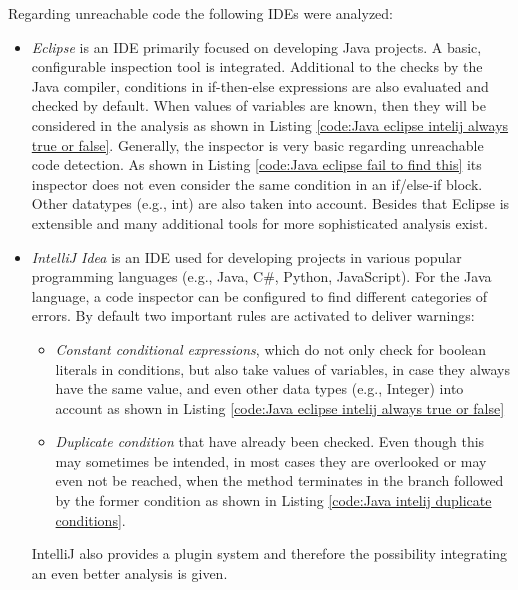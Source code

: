 Regarding unreachable code the following IDEs were analyzed:
\begin{itemize}
	\item \emph{Eclipse} \cite{incCommunityOpenInnovation} is an IDE primarily focused on developing Java projects. A basic, configurable inspection tool is integrated. Additional to the checks by the Java compiler, conditions in if-then-else expressions are also evaluated and checked by default. When values of variables are known, then they will be considered in the analysis as shown in Listing \ref{code:Java eclipse intelij always true or false}. Generally, the inspector is very basic regarding unreachable code detection. As shown in Listing \ref{code:Java eclipse fail to find this} its inspector does not even consider the same condition in an if/else-if block. Other datatypes (e.g., int) are also taken into account. Besides that Eclipse is extensible and many additional tools for more sophisticated analysis exist.
	\item \emph{IntelliJ Idea} \cite{IntelliJIDEACapable} is an IDE used for developing projects in various popular programming languages (e.g., Java, C\#, Python, JavaScript). For the Java language, a code inspector can be configured to find different categories of errors. By default two important rules are activated to deliver warnings: 
	\begin{itemize}
		\item \emph{Constant conditional expressions}, which do not only check for boolean literals in conditions, but also take values of variables, in case they always have the same value, and even other data types (e.g., Integer) into account as shown in Listing \ref{code:Java eclipse intelij always true or false}
		\item \emph{Duplicate condition} that have already been checked. Even though this may sometimes be intended, in most cases they are overlooked or may even not be reached, when the method terminates in the branch followed by the former condition as shown in Listing \ref{code:Java intelij duplicate conditions}. 
	\end{itemize}
	IntelliJ also provides a plugin system and therefore the possibility integrating an even better analysis is given.
\end{itemize}


